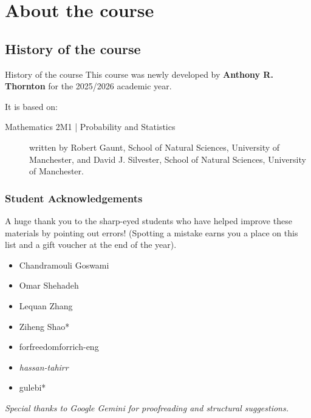 \section{About the course}

\subsection{History of the course}
\begin{frame}[allowframebreaks,label=History]{History of the course}
    This course was \alert{newly} developed by \textbf{Anthony R. Thornton} for the 2025/2026 academic year.

    It is based on:
    \begin{description}
        \item[Mathematics 2M1 | Probability and Statistics] written by Robert Gaunt, School of Natural Sciences, University of Manchester,
        and David J. Silvester, School of Natural Sciences, University of Manchester.
    \end{description}
\end{frame}

\begin{frame}[label=StudentAcknowledgements]
\frametitle{Student Acknowledgements}
 A huge thank you to the sharp-eyed students who have helped improve these materials by pointing out errors! (Spotting a mistake earns you a place on this list and a gift voucher at the end of the year).
    \begin{itemize}
        \item Chandramouli Goswami
        \item Omar Shehadeh
        \item Lequan Zhang
        \item Ziheng Shao*
        \item forfreedomforrich-eng
        \item \emph{hassan-tahirr}
        \item gulebi*

        
    \end{itemize}

    
     \textit{Special thanks to Google Gemini for proofreading and structural suggestions.}
\end{frame}

